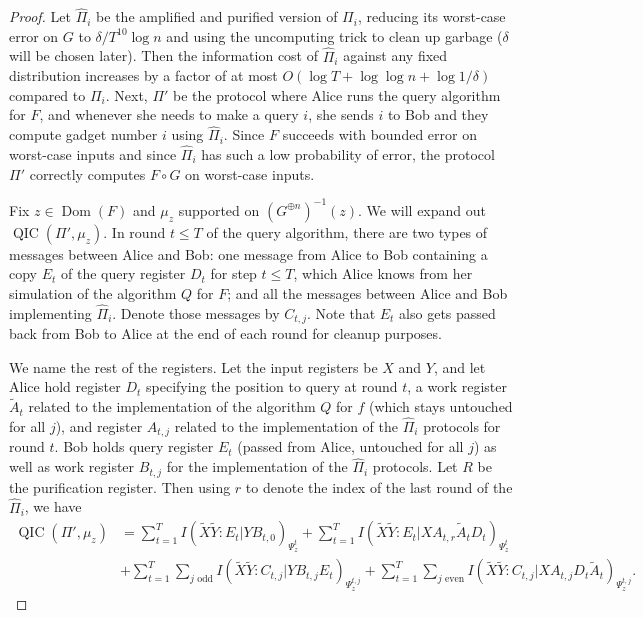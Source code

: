 \documentclass[10pt,a4paper]{article}
\theoremstyle{definition}
\DeclareMathOperator{\Dom}{Dom}
\renewcommand{\>}{\rangle}
\newcommand{\<}{\langle}
\newcommand{\tX}{\widetilde{X}}
\newcommand{\tY}{\widetilde{Y}}
\DeclareMathOperator{\QIC}{QIC}
\begin{document}
\begin{proof}
Let $\hat{\Pi}_i$ be the amplified and purified version of $\Pi_i$,
reducing its worst-case error on $G$ to $\delta/T^{10}\log n$
and using the uncomputing trick to clean up garbage
($\delta$ will be chosen later).
Then the information cost of $\hat{\Pi}_i$
against any fixed distribution increases by a factor
of at most $O(\log T+\log\log n+\log1/\delta)$ compared to $\Pi_i$.
Next, $\Pi'$ be the protocol where Alice runs the query algorithm
for $F$, and whenever she needs to make a query $i$, she sends
$i$ to Bob and they compute gadget number $i$ using $\hat{\Pi}_i$.
Since $F$ succeeds with bounded error on worst-case inputs
and since $\hat{\Pi}_i$ has such a low probability of error,
the protocol $\Pi'$ correctly computes $F\circ G$ on
worst-case inputs.

Fix $z\in\Dom(F)$ and $\mu_z$ supported on $(G^{\oplus n})^{-1}(z)$.
We will expand out $\QIC(\Pi',\mu_z)$.
In round $t\le T$ of the query algorithm, there
are two types of messages between Alice and Bob: one
message from Alice to Bob containing a copy $E_t$ of the query
register $D_t$ for step $t\le T$, which Alice knows from her simulation
of the algorithm $Q$ for $F$; and
all the messages between Alice and Bob implementing $\hat{\Pi}_i$.
Denote those messages by $C_{t,j}$. Note that
$E_t$ also gets passed back from Bob to Alice at the end of each
round for cleanup purposes.

We name the rest of the registers.
Let the input registers be $X$ and $Y$, and let Alice hold
register $D_t$ specifying the position
to query at round $t$, a work register $\tilde{A}_t$
related to the implementation of the algorithm
$Q$ for $f$ (which stays untouched for all $j$),
and register $A_{t,j}$ related to the implementation
of the $\hat{\Pi}_i$ protocols
for round $t$. Bob holds query register $E_t$
(passed from Alice, untouched for all $j$)
as well as work register $B_{t,j}$
for the implementation of the $\hat{\Pi}_i$ protocols.
Let $R$ be the purification register. Then using $r$
to denote the index of the last round of the $\hat{\Pi}_i$, we have
\begin{align*}
\QIC(\Pi',\mu_z)&=\sum_{t=1}^T I(\tX\tY:E_t|YB_{t,0})_{\Psi^t_z}
+\sum_{t=1}^T I(\tX\tY:E_t|XA_{t,r}\tilde{A}_tD_t)_{\Psi^t_z}\\
&+\sum_{t=1}^T\sum_{j\text{ odd}} I(\tX\tY:C_{t,j}|YB_{t,j}E_t)_{\Psi^{t,j}_z}
+\sum_{t=1}^T\sum_{j\text{ even}} I(\tX\tY:C_{t,j}|XA_{t,j}D_t\tilde{A}_t)_{\Psi^{t,j}_z}.
\end{align*}


\end{proof}
\end{document}
